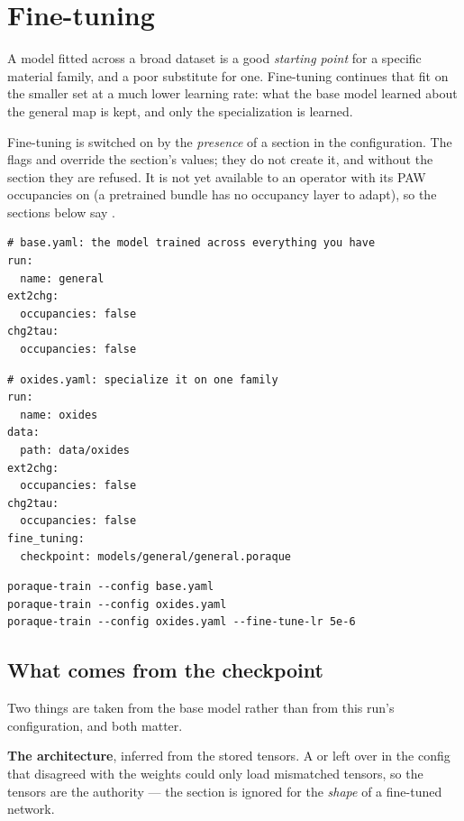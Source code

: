 \chapter{Fine-tuning}
\label{ch:finetuning}

A model fitted across a broad dataset is a good \emph{starting point} for a
specific material family, and a poor substitute for one. Fine-tuning continues
that fit on the smaller set at a much lower learning rate: what the base model
learned about the general map is kept, and only the specialization is learned.

Fine-tuning is switched on by the \emph{presence} of a 
section in the configuration. The flags  and
 override the section's values; they do not create it, and
without the section they are refused. It is not yet available to an operator
with its PAW occupancies on (a pretrained bundle has no occupancy layer to
adapt), so the sections below say .

\begin{lstlisting}
# base.yaml: the model trained across everything you have
run:
  name: general
ext2chg:
  occupancies: false
chg2tau:
  occupancies: false
\end{lstlisting}

\begin{lstlisting}
# oxides.yaml: specialize it on one family
run:
  name: oxides
data:
  path: data/oxides
ext2chg:
  occupancies: false
chg2tau:
  occupancies: false
fine_tuning:
  checkpoint: models/general/general.poraque
\end{lstlisting}

\begin{lstlisting}
poraque-train --config base.yaml
poraque-train --config oxides.yaml
poraque-train --config oxides.yaml --fine-tune-lr 5e-6
\end{lstlisting}

\section{What comes from the checkpoint}

Two things are taken from the base model rather than from this run's
configuration, and both matter.

\textbf{The architecture}, inferred from the stored tensors. A  or
 left over in the config that disagreed with the weights could only
load mismatched tensors, so the tensors are the authority --- the 
section is ignored for the \emph{shape} of a fine-tuned network.

